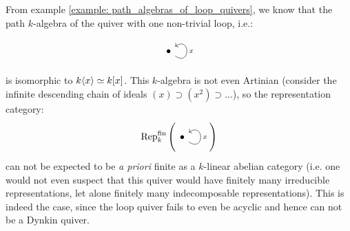             \begin{example}
                
            \end{example}
            \begin{example}
                
            \end{example}
            \begin{example}
                
            \end{example}
            \begin{example}
                From example \ref{example: path_algebras_of_loop_quivers}, we know that the path $k$-algebra of the quiver with one non-trivial loop, i.e.:
                    $$
                        \begin{tikzcd}
                            \bullet \arrow["x"', loop, distance=2em, in=35, out=325]
                        \end{tikzcd}
                    $$
                is isomorphic to $k\langle x\rangle \simeq k[x]$. This $k$-algebra is not even Artinian (consider the infinite descending chain of ideals $(x) \supset (x^2) \supset ...$), so the representation category:
                    $$\Rep_k^{\fin}\left(\begin{tikzcd}\bullet \arrow["x"', loop, distance=2em, in=35, out=325]\end{tikzcd}\right)$$
                can not be expected to be \textit{a priori} finite as a $k$-linear abelian category (i.e. one would not even suspect that this quiver would have finitely many irreducible representations, let alone finitely many indecomposable representations). This is indeed the case, since the loop quiver fails to even be acyclic and hence can not be a Dynkin quiver.
            \end{example}
            \begin{example}
                
            \end{example}
        
